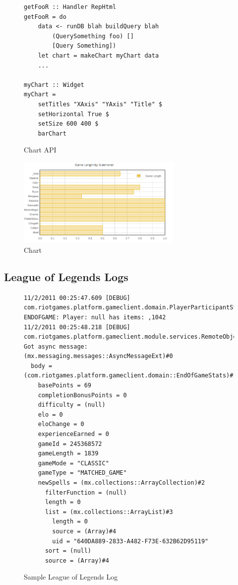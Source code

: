 \documentclass{chi2009}
\begin{document}
\begin{figure}[]
\begin{verbatim}
getFooR :: Handler RepHtml
getFooR = do
    data <- runDB blah buildQuery blah
        (QuerySomething foo) []
        [Query Something])
    let chart = makeChart myChart data
    ...

myChart :: Widget
myChart = 
    setTitles "XAxis" "YAxis" "Title" $
    setHorizontal True $
    setSize 600 400 $
    barChart
\end{verbatim}
    \caption{Chart API}
    \label{chartcode}
\end{figure}

\begin{figure}[h]
    \includegraphics[width=80mm]{imgs/chart.png}
    \caption{Chart}
    \label{chart}
\end{figure}

\subsection{League of Legends Logs}

\begin{figure}[]
\begin{verbatim}
11/2/2011 00:25:47.609 [DEBUG] com.riotgames.platform.gameclient.domain.PlayerParticipantStatsSummary ENDOFGAME: Player: null has items: ,1042
11/2/2011 00:25:48.218 [DEBUG] com.riotgames.platform.gameclient.module.services.RemoteObjectGenerator Got async message: (mx.messaging.messages::AsyncMessageExt)#0
  body = (com.riotgames.platform.gameclient.domain::EndOfGameStats)#1
    basePoints = 69
    completionBonusPoints = 0
    difficulty = (null)
    elo = 0
    eloChange = 0
    experienceEarned = 0
    gameId = 245368572
    gameLength = 1839
    gameMode = "CLASSIC"
    gameType = "MATCHED_GAME"
    newSpells = (mx.collections::ArrayCollection)#2
      filterFunction = (null)
      length = 0
      list = (mx.collections::ArrayList)#3
        length = 0
        source = (Array)#4
        uid = "640DA889-2833-A482-F73E-632B62D95119"
      sort = (null)
      source = (Array)#4
\end{verbatim}
    \caption{Sample League of Legends Log}
    \label{samplelog}
\end{figure}
\end{document}
